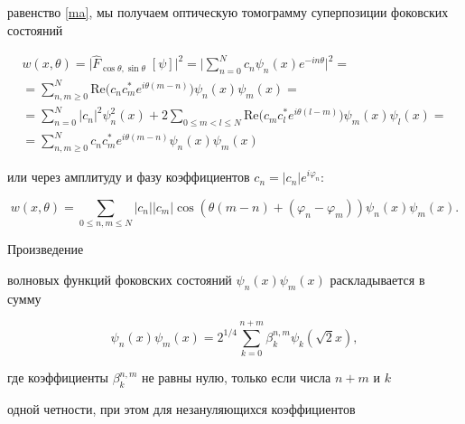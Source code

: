 равенство \eqref{ma}, мы получаем оптическую томограмму суперпозиции фоковских состояний \cite{dn}

\begin{multline}

w(x, {\theta})=\big|\hat F_{\cos\theta,\sin\theta}\; [\psi]\big|^2 = \bigg|\sum\limits_{n=0}^{N}c_n  \psi_n (x)  e^{-in{\theta}}\bigg|^2 =

\\ 

= \sum\limits_{n,m \geqslant 0}^N\text{Re} \big(c_n c_m^*e^{i{\theta}(m-n)}\big) \psi_n (x) \psi_m (x) = 

\\

= \sum\limits_{n=0}^{N}|c_n|^2  \psi_n^2 (x)  + 2 \sum\limits_{0\leqslant m < l\leqslant N }\text{Re} \big(c_m c_l^* e^{i{\theta}(l-m)}\big)\psi_m (x)\psi_l (x)=

\\

\label{dva}

=\sum\limits_{n,m\geqslant 0}^Nc_n c_m^* e^{i{\theta}(m-n)}\psi_n (x)\psi_m (x)

\end{multline}

или через амплитуду и фазу коэффициентов $c_n=|c_n|e^{i\varphi_n}$:

\begin{equation}\label{dvad}

w(x, {\theta})=\sum\limits_{0\leqslant n,m\leqslant N}|c_n|| c_m| \cos\left(\theta(m-n)+(\varphi_n-\varphi_m)\right)\psi_n (x)\psi_m (x).

\end{equation}

Произведение

 волновых функций фоковских состояний $\psi_n (x) \psi_m (x)$ раскладывается в сумму \cite{orlow}

\begin{equation}

\label{dvad5}

\psi_n (x) \psi_m (x)=2^{1/4}\sum\limits_{k=0}^{n+m}\beta_k^{n,m}\psi_k (\sqrt{2}x),

\end{equation}

где коэффициенты $\beta_k^{n,m}$ не равны нулю, только если числа $n+m$ и $k$ 

одной четности, при этом для незануляющихся коэффициентов

$$

